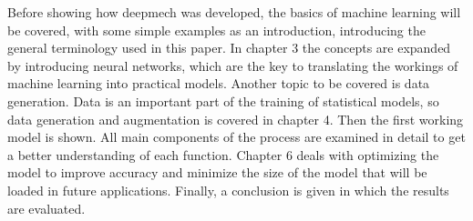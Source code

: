 Before showing how deepmech was developed, the basics of machine learning will be covered, with some simple examples as an introduction, introducing the general terminology used in this paper.
In chapter 3 the concepts are expanded by introducing neural networks, which are the key to translating the workings of machine learning into practical models.
Another topic to be covered is data generation. Data is an important part of the training of statistical models, so data generation and augmentation is covered in chapter 4.
Then the first working model is shown.
All main components of the process are examined in detail to get a better understanding of each function.
Chapter 6 deals with optimizing the model to improve accuracy and minimize the size of the model that will be loaded in future applications.
Finally, a conclusion is given in which the results are evaluated.
